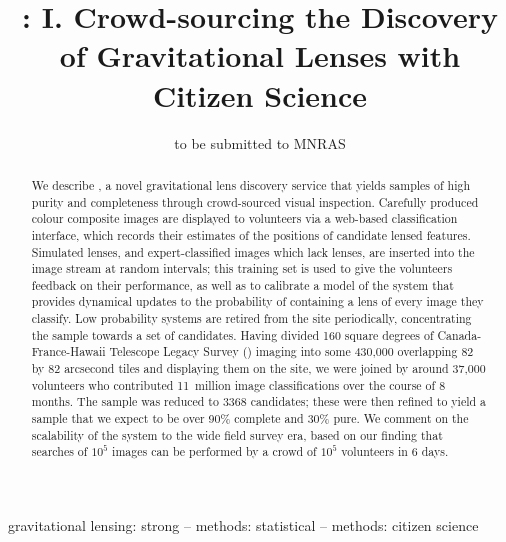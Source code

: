 \documentclass[useAMS,usenatbib,a4paper]{mn2e}
\title[\SW]
{\SW: I. Crowd-sourcing the Discovery of Gravitational Lenses with Citizen Science}
\author[Marshall et al.]{%
  
}
\begin{document}
\date{to be submitted to MNRAS}
\pagerange{\pageref{firstpage}--\pageref{lastpage}}

\maketitle

\label{firstpage}


\begin{abstract}

We describe \SW, a novel gravitational lens discovery service that yields
samples of high purity and completeness through crowd-sourced visual inspection.
Carefully produced colour composite images are displayed to volunteers via a
web-based classification interface, which records their estimates of the positions of
candidate lensed features. Simulated lenses, and expert-classified images which
lack lenses, are inserted into the image stream at random intervals; this
training set is used to give the volunteers feedback on their performance, as
well as to calibrate a model of the system that provides
dynamical updates to the probability of containing a lens
of every image they classify. Low probability systems are
retired from the site periodically, concentrating the sample towards a set of
candidates. Having divided 160 square degrees of Canada-France-Hawaii Telescope
Legacy Survey (\cfhtls) imaging into some 430,000 overlapping 82 by 82 arcsecond
tiles and displaying them on the site, we were joined by around 37,000
volunteers who contributed 11~million image classifications over the course of 8
months. The sample was reduced to 3368 \StageOne candidates; these were then
refined to yield a sample that we expect to be over 90\% complete and 30\% pure.
We comment on the scalability of the \SW system to the wide field survey era,
based on our finding that searches of $10^5$ images can be performed by a
crowd of $10^5$ volunteers in 6 days.
\end{abstract}


\begin{keywords}
  gravitational lensing: strong   --
  methods: statistical            --
  methods: citizen science
\end{keywords}

\setcounter{footnote}{1}
\end{document}
